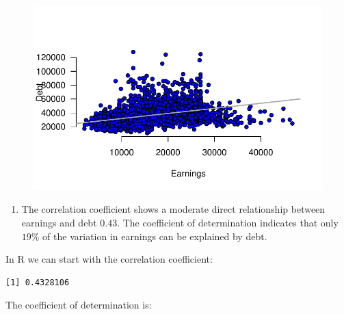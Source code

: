 \documentclass[
  letterpaper,
  DIV=11,
  numbers=noendperiod]{scrreprt}
\newenvironment{Shaded}{\begin{snugshade}}{\end{snugshade}}
\newcommand{\DecValTok}[1]{\textcolor[rgb]{0.68,0.00,0.00}{#1}}
\newcommand{\FunctionTok}[1]{\textcolor[rgb]{0.28,0.35,0.67}{#1}}
\newcommand{\NormalTok}[1]{\textcolor[rgb]{0.00,0.23,0.31}{#1}}
\newcommand{\SpecialCharTok}[1]{\textcolor[rgb]{0.37,0.37,0.37}{#1}}
\providecommand{\tightlist}{%
  \setlength{\itemsep}{0pt}\setlength{\parskip}{0pt}}\usepackage{longtable,booktabs,array}
\begin{document}
\begin{figure}[H]

{\centering \includegraphics{./07-RegressionI_files/figure-pdf/unnamed-chunk-17-1.pdf}

}

\end{figure}

\begin{enumerate}
\def\labelenumi{\arabic{enumi}.}
\setcounter{enumi}{1}
\tightlist
\item
  The correlation coefficient shows a moderate direct relationship
  between earnings and debt \(0.43\). The coefficient of determination
  indicates that only \(19\)\% of the variation in earnings can be
  explained by debt.
\end{enumerate}

In R we can start with the correlation coefficient:

\begin{Shaded}
\end{Shaded}

\begin{verbatim}
[1] 0.4328106
\end{verbatim}

The coefficient of determination is:

\begin{Shaded}
\end{Shaded}
\end{document}
